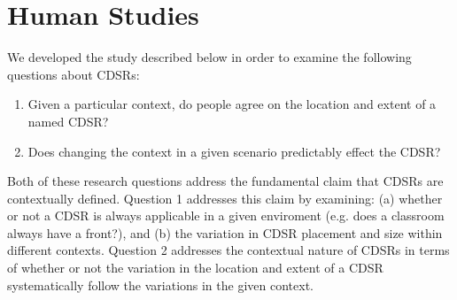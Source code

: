 \documentclass[11pt,letterpaper]{article}
\begin{document}


\section{Human Studies}

We developed the study described below in order to examine the following questions about CDSRs:
\begin{enumerate}
	\item Given a particular context, do people agree on the location and extent of a named CDSR?
	\item Does changing the context in a given scenario predictably effect the CDSR?
\end{enumerate}

Both of these research questions address the fundamental claim that CDSRs are contextually defined. Question 1 addresses this claim by examining: (a) whether or not a CDSR is always applicable in a given enviroment (e.g. does a classroom always have a front?), and (b) the variation in CDSR placement and size within different contexts. Question 2 addresses the contextual nature of CDSRs in terms of whether or not the variation in the location and extent of a CDSR systematically follow the variations  in the given context. 

\end{document}
